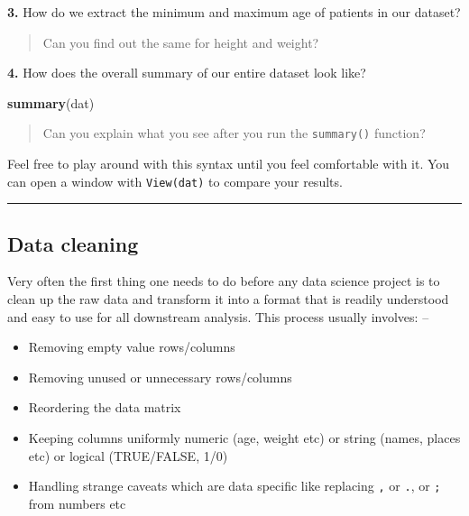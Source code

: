 \documentclass[
]{book}
\newenvironment{Shaded}{\begin{snugshade}}{\end{snugshade}}
\newcommand{\FunctionTok}[1]{\textcolor[rgb]{0.13,0.29,0.53}{\textbf{#1}}}
\newcommand{\NormalTok}[1]{#1}
\newcommand{\SpecialCharTok}[1]{\textcolor[rgb]{0.81,0.36,0.00}{\textbf{#1}}}
\providecommand{\tightlist}{%
  \setlength{\itemsep}{0pt}\setlength{\parskip}{0pt}}
\begin{document}
\textbf{3.} How do we extract the minimum and maximum age of patients in our dataset?

\begin{Shaded}
\end{Shaded}

\begin{quote}
Can you find out the same for height and weight?
\end{quote}

\textbf{4.} How does the overall summary of our entire dataset look like?

\begin{Shaded}
\begin{Highlighting}[]
\FunctionTok{summary}\NormalTok{(dat)}
\end{Highlighting}
\end{Shaded}

\begin{quote}
Can you explain what you see after you run the \texttt{summary()} function?
\end{quote}

Feel free to play around with this syntax until you feel comfortable with it.
You can open a window with \texttt{View(dat)} to compare your results.

\begin{center}\rule{0.5\linewidth}{0.5pt}\end{center}

\hypertarget{data-cleaning}{%
\subsection{Data cleaning}\label{data-cleaning}}

Very often the first thing one needs to do before any data science project is to clean up the raw data and transform it into a format that is readily understood and easy to use for all downstream analysis.
This process usually involves: --

\begin{itemize}
\tightlist
\item
  Removing empty value rows/columns
\item
  Removing unused or unnecessary rows/columns
\item
  Reordering the data matrix
\item
  Keeping columns uniformly numeric (age, weight etc) or string (names, places etc) or logical (TRUE/FALSE, 1/0)
\item
  Handling strange caveats which are data specific like replacing \texttt{,} or \texttt{.}, or \texttt{;} from numbers etc
\end{itemize}
\end{document}
